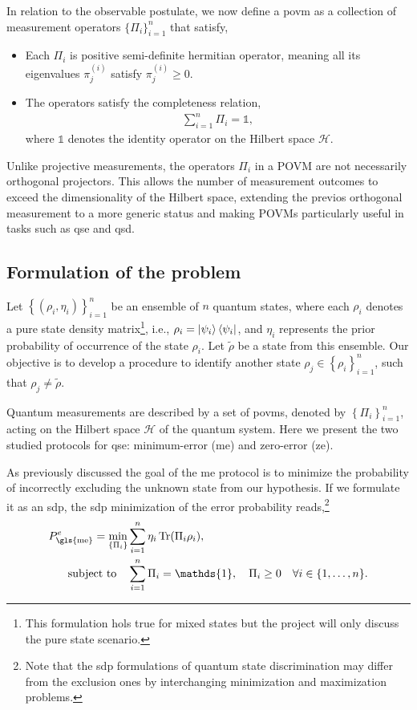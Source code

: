\documentclass[12pt,letterpaper]{article}
\DeclareMathOperator{\tr}{Tr}
\begin{document}
In relation to the observable postulate, we now define a \gls{povm} as a collection of measurement operators $\{\Pi_i\}_{i=1}^n$ that satisfy,
\begin{itemize}
	\item Each $\Pi_i$ is positive semi-definite hermitian operator, meaning all its eigenvalues $\pi_j^{(i)}$ satisfy $\pi_j^{(i)} \geq 0$.
	\item The operators satisfy the completeness relation,
\begin{align*}
	\sum_{i=1}^n \Pi_i = \mathds{1},
\end{align*}
where $\mathds{1}$ denotes the identity operator on the Hilbert space $\mathcal{H}$.
\end{itemize}

Unlike projective measurements, the operators $\Pi_i$ in a POVM are not necessarily orthogonal projectors. This allows the number of measurement outcomes to exceed the dimensionality of the Hilbert space, extending the previos orthogonal measurement to a more generic status and making POVMs particularly useful in tasks such as \gls{qse} and \gls{qsd}.

\subsection{Formulation of the problem}\label{sectionFormulationOfTheProblem}

Let $\left\{(\rho_i, \eta_i)\right\}_{i=1}^n$ be an ensemble of $n$ quantum states, where each $\rho_i$ denotes a pure state density matrix\footnote{This formulation hols true for mixed states but the project will only discuss the pure state scenario.}, i.e., $\rho_i = \ket{\psi_i}\bra{\psi_i}$, and $\eta_i$ represents the prior probability of occurrence of the state $\rho_i$. Let $\tilde{\rho}$ be a state from this ensemble. Our objective is to develop a procedure to identify another state $\rho_j \in \left\{\rho_i\right\}_{i=1}^n$, such that $\rho_j \neq \tilde{\rho}$.

Quantum measurements are described by a set of \glspl{povm}, denoted by $\left\{\Pi_i\right\}_{i=1}^n$, acting on the Hilbert space $\mathcal{H}$ of the quantum system. Here we present the two studied protocols for \gls{qse}: minimum-error (\gls{me}) and zero-error (\gls{ze}).

As previously discussed the goal of the \gls{me} protocol is to minimize the probability of incorrectly excluding the unknown state from our hypothesis. If we formulate it as an \gls{sdp}, the \gls{sdp} minimization of the error probability reads,\footnote{Note that the \gls{sdp} formulations of quantum state discrimination may differ from the exclusion ones by interchanging minimization and maximization problems.}
\begin{align*}
	P_{\text{\gls{me}}}^e = \min_{\left\{\Pi_i\right\}} &\sum_{i=1}^n \eta_i \tr(\Pi_i \rho_i),\\
	\text{subject to} \quad & \sum_{i=1}^n \Pi_i = \mathds{1}, \quad \Pi_i \geq 0 \quad \forall i \in \{1, \dots, n\}.
\end{align*}
\end{document}
